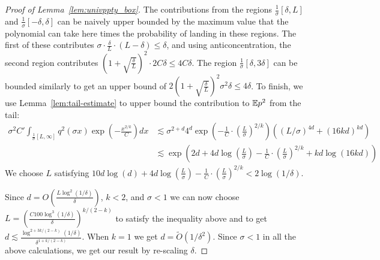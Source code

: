 \begin{proof}[Proof of Lemma~\ref{lem:univppty_box}]
The contributions from the regions $\frac{1}{\sigma}[\delta, L]$ and $\frac{1}{\sigma}[-\delta, \delta]$ can be naively upper bounded by the maximum value that the polynomial can take here times the probability of landing in these regions. The first of these contributes $\sigma \cdot \frac{\delta}{L} \cdot \left(L - \delta\right) \leq \delta$, and using anticoncentration, the second region contributes $ \left(1+\sqrt{\frac{\delta}{L}}\right)^2 \cdot 2C \delta \leq 4C \delta$. The region $\frac{1}{\sigma} [\delta, 3\delta]$ can be bounded similarly to get an upper bound of $2\left(1+\sqrt{\frac{\delta}{L}}\right)^2 \sigma^2 \delta \leq 4 \delta$. To finish, we use Lemma~\ref{lem:tail-estimate} to upper bound the contribution to $\mathbb{E} p^2$ from the tail:
\begin{align*}
    \sigma^2 C' \int_{\frac{1}{\sigma} [L, \infty]} q^2(\sigma x)\exp\left(-\frac{x^{2/k}}{C}\right) dx &\lesssim \sigma^{2+d}  4^d\exp\left(-\frac{1}{C} \cdot \left(\frac{L}{\sigma}\right)^{2/k}\right) ((L/\sigma)^{4d} + (16kd)^{kd})\\
    &\lesssim \exp\left( 2d + 4d\log\left(\frac{L}{\sigma}\right) -\frac{1}{C} \cdot \left(\frac{L}{\sigma}\right)^{2/k} + kd \log(16kd)\right)
\end{align*}
We choose $L$ satisfying $10 d \log(d)+ 4d\log(\frac{L}{\sigma}) -\frac{1}{C} \cdot (\frac{L}{\sigma})^{2/k} < 2 \log(1/\delta)$.

Since $d = O\left( \frac{L\log^2(1/\delta)}{\delta}\right)$, $k < 2$, and $\sigma < 1$ we can now choose $L = \left(\frac{C100\log^{3}(1/\delta)}{\delta}\right)^{k/(2-k)}$ to satisfy the inequality above and to get $d \lesssim \frac{\log^{2 + 3k/(2-k)}(1/\delta)}{\delta^{1 + k/(2-k)}}$.
 When $k =1$ we get $d = \tilde{O}(1/\delta^2)$. Since $\sigma < 1$ in all the above calculations, we get our result by re-scaling $\delta$. 






\end{proof} 

